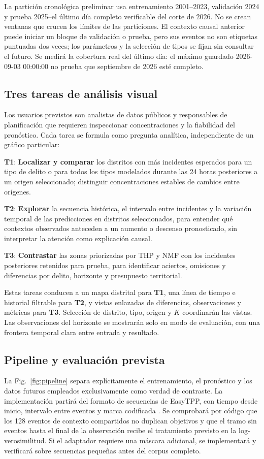 \documentclass[10pt,a4paper,twocolumn]{article}
\newcommand{\tarea}[1]{\textbf{T#1}}
\begin{document}
La partición cronológica preliminar usa entrenamiento 2001--2023, validación 2024 y prueba 2025--el último día completo verificable del corte de 2026. No se crean ventanas que crucen los límites de las particiones. El contexto causal anterior puede iniciar un bloque de validación o prueba, pero sus eventos no son etiquetas puntuadas dos veces; los parámetros y la selección de tipos se fijan sin consultar el futuro. Se medirá la cobertura real del último día: el máximo guardado 2026-09-03 00:00:00 no prueba que septiembre de 2026 esté completo.

\subsection{Tres tareas de análisis visual}
Los usuarios previstos son analistas de datos públicos y responsables de planificación que requieren inspeccionar concentraciones y la fiabilidad del pronóstico. Cada tarea se formula como pregunta analítica, independiente de un gráfico particular:

\noindent\tarea{1}: \textbf{Localizar y comparar} los distritos con más incidentes esperados para un tipo de delito o para todos los tipos modelados durante las 24 horas posteriores a un origen seleccionado; distinguir concentraciones estables de cambios entre orígenes.

\noindent\tarea{2}: \textbf{Explorar} la secuencia histórica, el intervalo entre incidentes y la variación temporal de las predicciones en distritos seleccionados, para entender qué contextos observados anteceden a un aumento o descenso pronosticado, sin interpretar la atención como explicación causal.

\noindent\tarea{3}: \textbf{Contrastar} las zonas priorizadas por THP y NMF con los incidentes posteriores retenidos para prueba, para identificar aciertos, omisiones y diferencias por delito, horizonte y presupuesto territorial.

Estas tareas conducen a un mapa distrital para \tarea{1}, una línea de tiempo e historial filtrable para \tarea{2}, y vistas enlazadas de diferencias, observaciones y métricas para \tarea{3}. Selección de distrito, tipo, origen y $K$ coordinarán las vistas. Las observaciones del horizonte se mostrarán solo en modo de evaluación, con una frontera temporal clara entre entrada y resultado.

\subsection{Pipeline y evaluación prevista}
La Fig.~\ref{fig:pipeline} separa explícitamente el entrenamiento, el pronóstico y los datos futuros empleados exclusivamente como verdad de contraste. La implementación partirá del formato de secuencias de EasyTPP, con tiempo desde inicio, intervalo entre eventos y marca codificada \cite{easytppDataset}. Se comprobará por código que los 128 eventos de contexto compartidos no duplican objetivos y que el tramo sin eventos hasta el final de la observación recibe el tratamiento previsto en la log-verosimilitud. Si el adaptador requiere una máscara adicional, se implementará y verificará sobre secuencias pequeñas antes del corpus completo.
\end{document}
